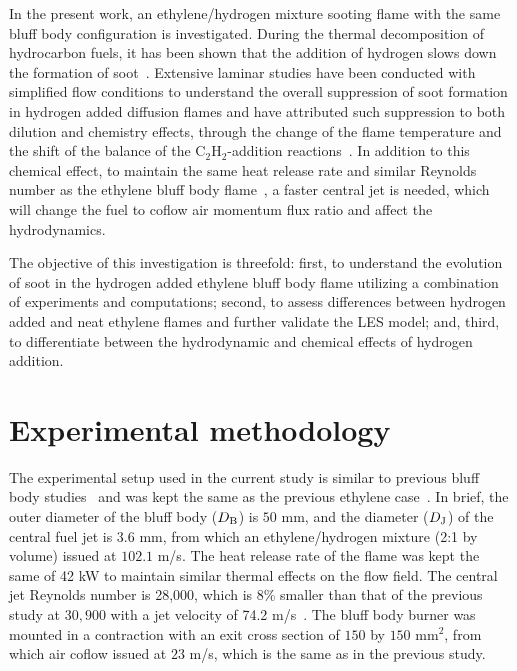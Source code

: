 \documentclass[review,3p,times]{elsarticle}
\begin{document}
In the present work, an ethylene/hydrogen mixture sooting flame with the same bluff body configuration is investigated.  During the thermal decomposition of hydrocarbon fuels, it has been shown that the addition of hydrogen slows down the formation of soot~\cite{tesner58}.  Extensive laminar studies have been conducted with simplified flow conditions to understand the overall suppression of soot formation in hydrogen added diffusion flames and have attributed such suppression to both dilution and chemistry effects\textcolor{Rv1}{, through the change of the flame temperature and the shift of the balance of the C$_2$H$_2$-addition reactions}~\cite{dearden68,du95,gulder96,guo06,zhao14}.  In addition to this chemical effect, to maintain the same \textcolor{Rv1}{heat release rate and similar }Reynolds number as the ethylene bluff body flame~\cite{mueller13}, a faster central jet is needed, which will change the fuel to coflow air momentum flux ratio and affect the hydrodynamics.

The objective of this investigation is threefold: first, to understand the evolution of soot in the hydrogen added ethylene bluff body flame utilizing a combination of experiments and computations; second, to assess differences between hydrogen added and neat ethylene flames and further validate the LES model; and, third, to differentiate between the hydrodynamic and chemical effects of hydrogen addition.



\section{Experimental methodology}

The experimental setup used in the current study is similar to previous bluff body studies~\cite{dally96,dally98a} and was kept the same as the previous ethylene case~\cite{mueller13}.  In brief, the outer diameter of the bluff body ($D_{\rm B}$) is $50$ mm, and the diameter ($D_{\rm J}$) of the central fuel jet is $3.6$ mm, from which an ethylene/hydrogen mixture (2:1 by volume) issued at $102.1$ m/s.  \textcolor{Rv1}{The heat release rate of the flame was kept the same of 42 kW to maintain similar thermal effects on the flow field.  The central jet Reynolds number is 28,000, which is 8\% smaller than that of the previous study at $30,900$ with a jet velocity of 74.2 m/s~\cite{mueller13}.}  The bluff body burner was mounted in a contraction with an exit cross section of $150$ by $150$ mm$^2$, from which air coflow issued at $23$ m/s\textcolor{Rv1}{, which is the same as in the previous study.}
\end{document}
